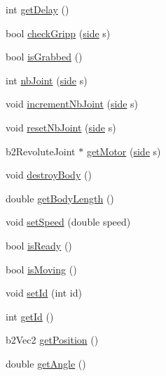 \begin{DoxyCompactItemize}
\item 
int \mbox{\hyperlink{class_robot_ad9b03690ffb189f0990dacb813b2b72c}{get\+Delay}} ()
\item 
bool \mbox{\hyperlink{class_robot_a27c9de7d6dcb6ca98fcbe3aa7c55bf9a}{check\+Gripp}} (\mbox{\hyperlink{_robot_8h_afc015eff6557e84151d2e53b94375445}{side}} s)
\item 
bool \mbox{\hyperlink{class_robot_a156c0ecf0bed5e117335d4c1c12d2d06}{is\+Grabbed}} ()
\item 
int \mbox{\hyperlink{class_robot_ae6f0f49e30cf9c65605f6a75f390ec52}{nb\+Joint}} (\mbox{\hyperlink{_robot_8h_afc015eff6557e84151d2e53b94375445}{side}} s)
\item 
void \mbox{\hyperlink{class_robot_af5b6b2dc9efa49654cf80abe298cc6f9}{increment\+Nb\+Joint}} (\mbox{\hyperlink{_robot_8h_afc015eff6557e84151d2e53b94375445}{side}} s)
\item 
void \mbox{\hyperlink{class_robot_abbba5cddb2dc90005c26b99d968f102d}{reset\+Nb\+Joint}} (\mbox{\hyperlink{_robot_8h_afc015eff6557e84151d2e53b94375445}{side}} s)
\item 
b2\+Revolute\+Joint $\ast$ \mbox{\hyperlink{class_robot_aafe55f24c0b2ba70dc915362abd46485}{get\+Motor}} (\mbox{\hyperlink{_robot_8h_afc015eff6557e84151d2e53b94375445}{side}} s)
\item 
void \mbox{\hyperlink{class_robot_a3014b34d9b3da6e4a33933c937e578aa}{destroy\+Body}} ()
\item 
double \mbox{\hyperlink{class_robot_af0254cdb4fd2d60279f7b6b12a12bc4e}{get\+Body\+Length}} ()
\item 
void \mbox{\hyperlink{class_robot_a0a1948c69efd8bce2487afdedb6f47f1}{set\+Speed}} (double speed)
\item 
bool \mbox{\hyperlink{class_robot_a521b65cb8bc45f7eae7bdaae0cd0f847}{is\+Ready}} ()
\item 
bool \mbox{\hyperlink{class_robot_a885b7c6b9da718dfe4eb53802adfce92}{is\+Moving}} ()
\item 
void \mbox{\hyperlink{class_robot_a46b12a6c9386c0067f9f35b3e60a25f7}{set\+Id}} (int id)
\item 
int \mbox{\hyperlink{class_robot_a8d1d94c9cab78a96851785b1679cd457}{get\+Id}} ()
\item 
b2\+Vec2 \mbox{\hyperlink{class_robot_af8bdea28202e00ebf48187b8943b245c}{get\+Position}} ()
\item 
double \mbox{\hyperlink{class_robot_a41a470133819059706aab8a8d546f6bc}{get\+Angle}} ()
\end{DoxyCompactItemize}
